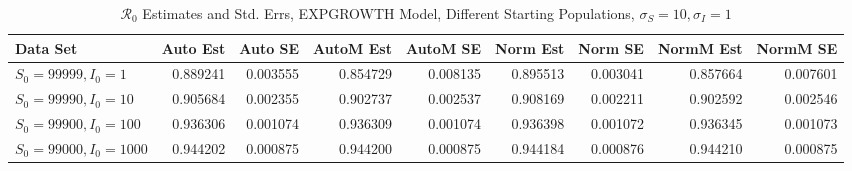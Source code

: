 \documentclass[12pt]{article}
\newcommand{\rr}{\ensuremath{\mathcal{R}_0}}
\begin{document}
\begin{table}[H]
	
	\caption{$\rr$ Estimates and Std. Errs, EXPGROWTH Model,
		Different Starting Populations, 
		$\sigma_S = 10, \sigma_I = 1$}
	\begin{footnotesize}
		\hskip -1.7cm
	\begin{tabular}{l|r|r|r|r|r|r|r|r}
		\hline
		Data Set & Auto Est & Auto SE & AutoM Est & AutoM SE & Norm Est & Norm SE & NormM Est & NormM SE\\
		\hline
		$S_0 = 99999, I_0 = 1$ & 0.889241 & 0.003555 & 0.854729 & 0.008135 & 0.895513 & 0.003041 & 0.857664 & 0.007601\\
		\hline
		$S_0 = 99990, I_0 = 10$ & 0.905684 & 0.002355 & 0.902737 & 0.002537 & 0.908169 & 0.002211 & 0.902592 & 0.002546\\
		\hline
		$S_0 = 99900, I_0 = 100$ & 0.936306 & 0.001074 & 0.936309 & 0.001074 & 0.936398 & 0.001072 & 0.936345 & 0.001073\\
		\hline
		$S_0 = 99000, I_0 = 1000$ & 0.944202 & 0.000875 & 0.944200 & 0.000875 & 0.944184 & 0.000876 & 0.944210 & 0.000875\\
		\hline
	\end{tabular}
\end{footnotesize}
\end{table}
\end{document}
